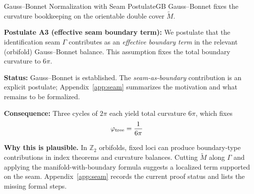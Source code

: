 \begin{axiom}{Gauss--Bonnet Normalization with Seam Postulate}{GB}
Gauss--Bonnet fixes the curvature bookkeeping on the orientable double cover $\widetilde{M}$.

\textbf{Postulate A3 (effective seam boundary term):} We postulate that the identification seam 
$\Gamma$ contributes as an \emph{effective boundary term} in the relevant (orbifold) Gauss--Bonnet balance. 
This assumption fixes the total boundary curvature to $6\pi$.

\tcblower
\textbf{Status:} Gauss--Bonnet is established. The \emph{seam-as-boundary} contribution is an explicit postulate; 
Appendix~\ref{app:seam} summarizes the motivation and what remains to be formalized.

\textbf{Consequence:} Three cycles of $2\pi$ each yield total curvature $6\pi$, 
which fixes
\begin{equation}
    \varphi_{\mathrm{tree}} = \frac{1}{6\pi}
\end{equation}
\end{axiom}

\noindent\textbf{Why this is plausible.} In $\mathbb{Z}_2$ orbifolds, fixed loci can produce boundary-type 
contributions in index theorems and curvature balances. Cutting $\widetilde{M}$ along $\Gamma$ and applying the 
manifold-with-boundary formula suggests a localized term supported on the seam. Appendix~\ref{app:seam} records the 
current proof status and lists the missing formal steps.

